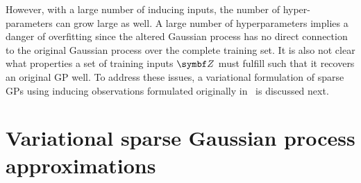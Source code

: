 However, with a large number of inducing inputs, the number of hyper-parameters can grow large as well.
A large number of hyperparameters implies a danger of overfitting since the altered Gaussian process has no direct connection to the original Gaussian process over the complete training set.
It is also not clear what properties a set of training inputs $\mat{Z}$ must fulfill such that it recovers an original GP well.
To address these issues, a variational formulation of sparse GPs using inducing observations formulated originally in~\parencite{titsias_variational_2009,hensman_gaussian_2013} is discussed next.

\section{Variational sparse Gaussian process approximations}
\label{toc:gp:sparse_gps}
